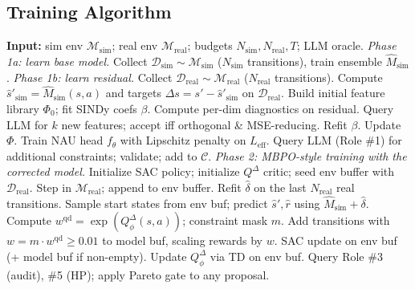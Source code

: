 \documentclass{article}
\theoremstyle{definition}
\newcommand{\Msim}{\mathcal{M}_{\mathrm{sim}}}
\newcommand{\Mreal}{\mathcal{M}_{\mathrm{real}}}
\newcommand{\QD}{Q^{\Delta}}
\begin{document}
\subsection{Training Algorithm}
\label{sec:method-algo}

\begin{algorithm}[t]
\small
\caption{MC-WM: Model-Corrected World Model}
\label{alg:mcwm}
\begin{algorithmic}[1]
\State \textbf{Input:} sim env $\Msim$; real env $\Mreal$; budgets $N_{\mathrm{sim}}, N_{\mathrm{real}}, T$; LLM oracle.
\Statex \hspace{3mm} \textit{Phase 1a: learn base model.}
\State Collect $\mathcal D_{\mathrm{sim}}\sim\Msim$ ($N_{\mathrm{sim}}$ transitions), train ensemble $\hat M_{\mathrm{sim}}$.
\Statex \hspace{3mm} \textit{Phase 1b: learn residual.}
\State Collect $\mathcal D_{\mathrm{real}}\sim\Mreal$ ($N_{\mathrm{real}}$ transitions).
\State Compute $\hat s'_{\mathrm{sim}}=\hat M_{\mathrm{sim}}(s,a)$ and targets $\Delta s = s'-\hat s'_{\mathrm{sim}}$ on $\mathcal D_{\mathrm{real}}$.
\State Build initial feature library $\Phi_0$; fit SINDy coefs $\beta$.
  \State Compute per-dim diagnostics on residual.
  \State Query LLM for $k$ new features; accept iff orthogonal \& MSE-reducing.
  \State Refit $\beta$.  Update $\Phi$.
\EndFor
\State Train NAU head $f_\theta$ with Lipschitz penalty on $L_{\mathrm{eff}}$.
\State Query LLM (Role \#1) for additional constraints; validate; add to $\mathcal C$.
\Statex \hspace{3mm} \textit{Phase 2: MBPO-style training with the corrected model.}
\State Initialize SAC policy; initialize $\QD$ critic; seed env buffer with $\mathcal D_{\mathrm{real}}$.
  \State Step in $\Mreal$; append to env buffer.
   \State Refit $\hat\delta$ on the last $N_{\mathrm{real}}$ real transitions. \EndIf
    \State Sample start states from env buf; predict $\hat s',\hat r$ using
    $\hat M_{\mathrm{sim}}+\hat\delta$.
    \State Compute $w^{\mathrm{qd}}=\exp(\QD_\phi(s,a))$; constraint mask $m$.
    \State Add transitions with $w = m\cdot w^{\mathrm{qd}} \ge 0.01$ to model buf, scaling rewards by $w$.
  \EndIf
  \State SAC update on env buf (+ model buf if non-empty).  Update $\QD_\phi$ via TD on env buf.
    \State Query Role \#3 (audit), \#5 (HP); apply Pareto gate to any proposal.
  \EndIf
\EndFor
\end{algorithmic}
\end{algorithm}
\end{document}
